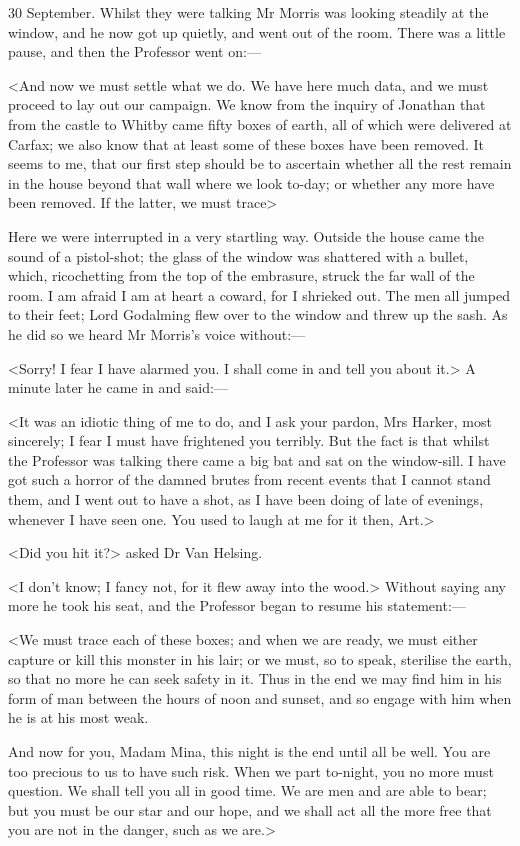 \begin{diary}{30 September.}
Whilst they were talking Mr Morris was looking steadily at the window, and he now got up quietly, and went out of the room. There was a little pause, and then the Professor went on:—

<And now we must settle what we do. We have here much data, and we must proceed to lay out our campaign. We know from the inquiry of Jonathan that from the castle to Whitby came fifty boxes of earth, all of which were delivered at Carfax; we also know that at least some of these boxes have been removed. It seems to me, that our first step should be to ascertain whether all the rest remain in the house beyond that wall where we look to-day; or whether any more have been removed. If the latter, we must trace\longdash>

Here we were interrupted in a very startling way. Outside the house came the sound of a pistol-shot; the glass of the window was shattered with a bullet, which, ricochetting from the top of the embrasure, struck the far wall of the room. I am afraid I am at heart a coward, for I shrieked out. The men all jumped to their feet; Lord Godalming flew over to the window and threw up the sash. As he did so we heard Mr Morris's voice without:—

<Sorry! I fear I have alarmed you. I shall come in and tell you about it.> A minute later he came in and said:—

<It was an idiotic thing of me to do, and I ask your pardon, Mrs Harker, most sincerely; I fear I must have frightened you terribly. But the fact is that whilst the Professor was talking there came a big bat and sat on the window-sill. I have got such a horror of the damned brutes from recent events that I cannot stand them, and I went out to have a shot, as I have been doing of late of evenings, whenever I have seen one. You used to laugh at me for it then, Art.>

<Did you hit it?> asked Dr Van Helsing.

<I don't know; I fancy not, for it flew away into the wood.> Without saying any more he took his seat, and the Professor began to resume his statement:—

<We must trace each of these boxes; and when we are ready, we must either capture or kill this monster in his lair; or we must, so to speak, sterilise the earth, so that no more he can seek safety in it. Thus in the end we may find him in his form of man between the hours of noon and sunset, and so engage with him when he is at his most weak.

And now for you, Madam Mina, this night is the end until all be well. You are too precious to us to have such risk. When we part to-night, you no more must question. We shall tell you all in good time. We are men and are able to bear; but you must be our star and our hope, and we shall act all the more free that you are not in the danger, such as we are.>


\end{diary}
